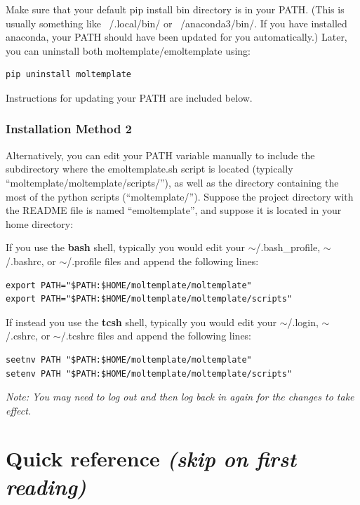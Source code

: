 \documentclass[11pt]{article}
\begin{document}

Make sure that your default pip install bin directory is in your PATH.  (This is usually something like ~/.local/bin/ or ~/anaconda3/bin/.  If you have installed anaconda, your PATH should have been updated for you automatically.)  Later, you can uninstall both moltemplate/emoltemplate using:
\begin{verbatim}
pip uninstall moltemplate
\end{verbatim}
Instructions for updating your PATH are included below.


\subsubsection*{Installation Method 2}

Alternatively, you can edit your PATH variable manually to include
the subdirectory where the emoltemplate.sh script is located 
(typically ``moltemplate/moltemplate/scripts/''), as well as 
the directory containing the most of the python scripts (``moltemplate/'').
Suppose the project directory with the README file is named
``emoltemplate'', and suppose it is located in your home directory:

If you use the \textbf{bash} shell, typically you would edit your 
\mbox{$\sim$/.bash\_profile}, 
\mbox{$\sim$/.bashrc}, or 
\mbox{$\sim$/.profile} files
and append the following lines:
\begin{verbatim}
export PATH="$PATH:$HOME/moltemplate/moltemplate"
export PATH="$PATH:$HOME/moltemplate/moltemplate/scripts"
\end{verbatim}
If instead you use the \textbf{tcsh} shell, typically you would edit your 
\mbox{$\sim$/.login}, 
\mbox{$\sim$/.cshrc}, or 
\mbox{$\sim$/.tcshrc} files 
and append the following lines:
\begin{verbatim}
seetnv PATH "$PATH:$HOME/moltemplate/moltemplate"
setenv PATH "$PATH:$HOME/moltemplate/moltemplate/scripts"
\end{verbatim}


\textit{Note: You may need to log out and then 
log back in again for the changes to take effect.}



\pagebreak
\section{Quick reference \textit{(skip on first reading)}}
\end{document}
